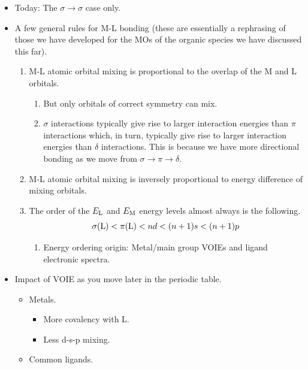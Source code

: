 \documentclass[../notes.tex]{subfiles}
\begin{document}
\begin{itemize}
\begin{itemize}
    \end{itemize}
    \item Today: The $\sigma\to\sigma$ case only.
    \item A few general rules for M-L bonding (these are essentially a rephrasing of those we have developed for the MOs of the organic species we have discussed this far).
    \begin{enumerate}
        \item M-L atomic orbital mixing is proportional to the overlap of the M and L orbitals.
        \begin{enumerate}
            \item But only orbitals of correct symmetry can mix.
            \item $\sigma$ interactions typically give rise to larger interaction energies than $\pi$ interactions which, in turn, typically give rise to larger interaction energies than $\delta$ interactions. This is because we have more directional bonding as we move from $\sigma\to\pi\to\delta$.
        \end{enumerate}
        \item M-L atomic orbital mixing is inversely proportional to energy difference of mixing orbitals.
        \item The order of the $E_{\ce{L}}$ and $E_{\ce{M}}$ energy levels almost always is the following.
        \begin{equation*}
            \sigma(\ce{L}) < \pi(\ce{L})
            < nd
            < (n+1)s
            < (n+1)p
        \end{equation*}
        \begin{enumerate}
            \item Energy ordering origin: Metal/main group VOIEs and ligand electronic spectra.
        \end{enumerate}
    \end{enumerate}
    \item Impact of VOIE as you move later in the periodic table.
    \begin{itemize}
        \item Metals.
        \begin{itemize}
            \item More covalency with L.
            \item Less d-s-p mixing.
        \end{itemize}
        \item Common ligands.
        \begin{itemize}

\end{itemize}
\end{itemize}
\end{itemize}
\end{document}
